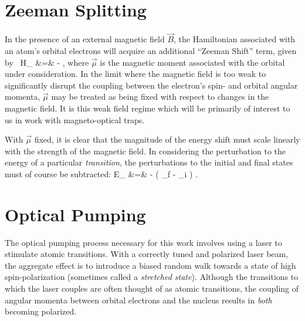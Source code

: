 \section{Zeeman Splitting}
\label{sec:zeemansplitting}
In the presence of an external magnetic field $\vec{B}$, the Hamiltonian associated with an atom's orbital electrons will acquire an additional ``Zeeman Shift'' term, given by~\cite{corney}
\bea
\label{zeeman_hamiltonian}
H_{} &=& - \vec{\mu}\cdot {},
\eea
where $\vec{\mu}$ is the magnetic moment associated with the orbital under consideration.  In the limit where the magnetic field is too weak to significantly disrupt the coupling between the electron's spin- and orbital angular momenta, $\vec{\mu}$ may be treated as being fixed with respect to changes in the magnetic field.  It is this weak field regime which will be primarily of interest to us in work with magneto-optical traps.


With $\vec{\mu}$ fixed, it is clear that the magnitude of the energy shift must scale linearly with the strength of the magnetic field.  In considering the perturbation to the energy of a particular \emph{transition}, the perturbations to the initial and final states must of course be subtracted:
\bea
\Delta E_{} &=& - \left( \vec{\mu}_f - \vec{\mu}_i \right) \cdot {}.
\eea 







\section{Optical Pumping}
\label{sec:op}
The optical pumping process necessary for this work involves using a laser to stimulate atomic transitions.  With a correctly tuned and polarized laser beam, the aggregate effect is to introduce a biased random walk towards a state of high spin-polarization (sometimes called a \emph{stretched state}).  Although the transitions to which the laser couples are often thought of as atomic transitions, the coupling of angular momenta between orbital electrons and the nucleus results in \emph{both} becoming polarized.  

